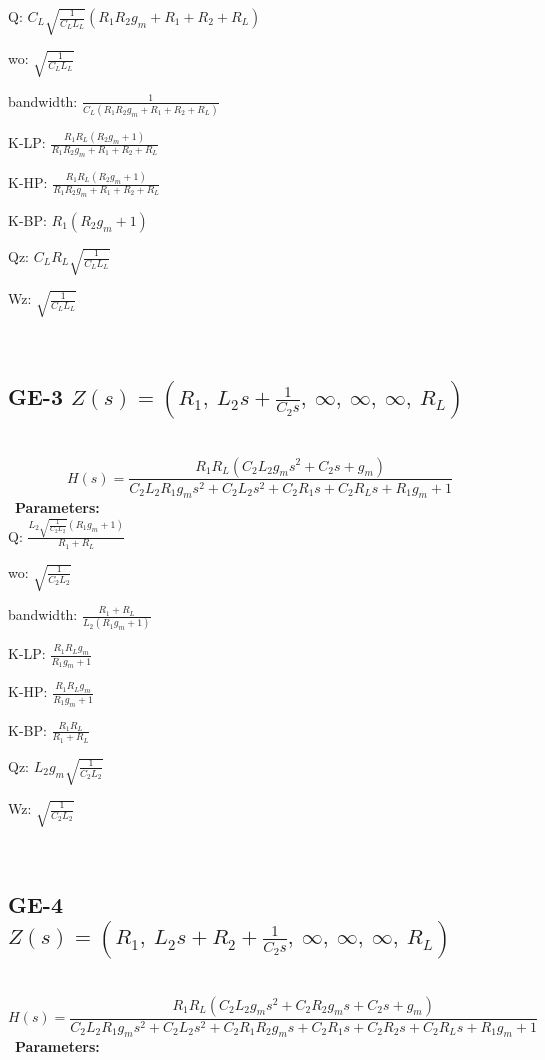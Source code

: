 \documentclass{article}
\begin{document}
Q: $C_{L} \sqrt{\frac{1}{C_{L} L_{L}}} \left(R_{1} R_{2} g_{m} + R_{1} + R_{2} + R_{L}\right)$\ 

wo: $\sqrt{\frac{1}{C_{L} L_{L}}}$\ 

bandwidth: $\frac{1}{C_{L} \left(R_{1} R_{2} g_{m} + R_{1} + R_{2} + R_{L}\right)}$\ 

K-LP: $\frac{R_{1} R_{L} \left(R_{2} g_{m} + 1\right)}{R_{1} R_{2} g_{m} + R_{1} + R_{2} + R_{L}}$\ 

K-HP: $\frac{R_{1} R_{L} \left(R_{2} g_{m} + 1\right)}{R_{1} R_{2} g_{m} + R_{1} + R_{2} + R_{L}}$\ 

K-BP: $R_{1} \left(R_{2} g_{m} + 1\right)$\ 

Qz: $C_{L} R_{L} \sqrt{\frac{1}{C_{L} L_{L}}}$\ 

Wz: $\sqrt{\frac{1}{C_{L} L_{L}}}$\ 

\ 

\subsection{GE-3 $Z(s) = \left( R_{1}, \  L_{2} s + \frac{1}{C_{2} s}, \  \infty, \  \infty, \  \infty, \  R_{L}\right)$ } \ 
\textbf{\[H(s) = \frac{R_{1} R_{L} \left(C_{2} L_{2} g_{m} s^{2} + C_{2} s + g_{m}\right)}{C_{2} L_{2} R_{1} g_{m} s^{2} + C_{2} L_{2} s^{2} + C_{2} R_{1} s + C_{2} R_{L} s + R_{1} g_{m} + 1}\] } \ 
\textbf{Parameters:}\\ 

Q: $\frac{L_{2} \sqrt{\frac{1}{C_{2} L_{2}}} \left(R_{1} g_{m} + 1\right)}{R_{1} + R_{L}}$\ 

wo: $\sqrt{\frac{1}{C_{2} L_{2}}}$\ 

bandwidth: $\frac{R_{1} + R_{L}}{L_{2} \left(R_{1} g_{m} + 1\right)}$\ 

K-LP: $\frac{R_{1} R_{L} g_{m}}{R_{1} g_{m} + 1}$\ 

K-HP: $\frac{R_{1} R_{L} g_{m}}{R_{1} g_{m} + 1}$\ 

K-BP: $\frac{R_{1} R_{L}}{R_{1} + R_{L}}$\ 

Qz: $L_{2} g_{m} \sqrt{\frac{1}{C_{2} L_{2}}}$\ 

Wz: $\sqrt{\frac{1}{C_{2} L_{2}}}$\ 

\ 

\subsection{GE-4 $Z(s) = \left( R_{1}, \  L_{2} s + R_{2} + \frac{1}{C_{2} s}, \  \infty, \  \infty, \  \infty, \  R_{L}\right)$ } \ 
\textbf{\[H(s) = \frac{R_{1} R_{L} \left(C_{2} L_{2} g_{m} s^{2} + C_{2} R_{2} g_{m} s + C_{2} s + g_{m}\right)}{C_{2} L_{2} R_{1} g_{m} s^{2} + C_{2} L_{2} s^{2} + C_{2} R_{1} R_{2} g_{m} s + C_{2} R_{1} s + C_{2} R_{2} s + C_{2} R_{L} s + R_{1} g_{m} + 1}\] } \ 
\textbf{Parameters:}\\ 
\end{document}
